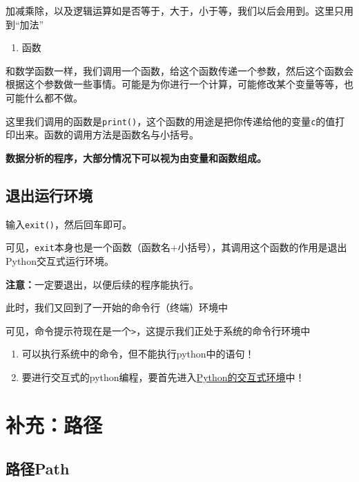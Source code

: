 \documentclass[
  letterpaper,
  DIV=11,
  numbers=noendperiod]{scrreprt}
\providecommand{\tightlist}{%
  \setlength{\itemsep}{0pt}\setlength{\parskip}{0pt}}\usepackage{longtable,booktabs,array}
\begin{document}
加减乘除，以及逻辑运算如是否等于，大于，小于等，我们以后会用到。这里只用到``加法''

\begin{enumerate}
\def\labelenumi{\arabic{enumi}.}
\setcounter{enumi}{2}
\tightlist
\item
  函数
\end{enumerate}

和数学函数一样，我们调用一个函数，给这个函数传递一个参数，然后这个函数会根据这个参数做一些事情。可能是为你进行一个计算，可能修改某个变量等等，也可能什么都不做。

这里我们调用的函数是\texttt{print()}，这个函数的用途是把你传递给他的变量\texttt{c}的值打印出来。函数的调用方法是函数名与小括号。

\textbf{数据分析的程序，大部分情况下可以视为由变量和函数组成。}

\hypertarget{ux9000ux51faux8fd0ux884cux73afux5883}{%
\subsection{退出运行环境}\label{ux9000ux51faux8fd0ux884cux73afux5883}}

输入\texttt{exit()}，然后回车即可。

可见，\texttt{exit}本身也是一个函数（函数名+小括号），其调用这个函数的作用是退出Python交互式运行环境。

{\textbf{注意：}}一定要退出，以便后续的程序能执行。

此时，我们又回到了一开始的命令行（终端）环境中

可见，命令提示符现在是一个\texttt{\textgreater{}}，这提示我们正处于系统的命令行环境中

\begin{enumerate}
\def\labelenumi{\arabic{enumi}.}
\tightlist
\item
  可以执行系统中的命令，但不能执行python中的语句！
\item
  要进行交互式的python编程，要首先进入\protect\hyperlink{python_interactive}{Python的交互式环境}中！
\end{enumerate}

\hypertarget{ux8865ux5145ux8defux5f84}{%
\section{补充：路径}\label{ux8865ux5145ux8defux5f84}}

\hypertarget{path}{%
\subsection{路径Path}\label{path}}
\end{document}
